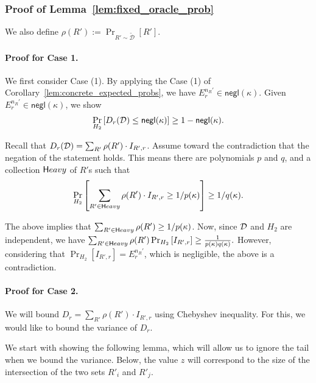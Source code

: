 \subsubsection{Proof of Lemma~\ref{lem:fixed_oracle_prob}}

We also define $\rho(R') := \Pr_{R' \sim \tilde{\mathcal{D}}}[R']$. 

\paragraph{Proof for Case 1.}
We first consider Case (1). By applying the Case (1) of 
Corollary~\ref{lem:concrete_expected_probs}, we have
$E^{n_R'}_{r} \in \mathsf{negl}(\kappa)$.  Given
$E^{n_R'}_{r} \in \mathsf{negl}(\kappa)$, we show 
\[
\Pr_{H_2}\left[ D_r(\DDD) \leq \mathsf{negl}(\kappa) \right] \ge 1 - \negl(\kappa).
\]

Recall that 
$D_r(\DDD) = \sum_{R'} \rho(R') \cdot I_{R',r}$.  Assume toward
the contradiction that the negation of the statement holds. This means
there are polynomials $p$ and $q$, and a collection $\sf Heavy$ of $R'$s
such that
%
\[ \Pr_{H_2}\left[
\sum_{R' \in {\sf Heavy}} \rho(R') \cdot I_{R', r} \ge 1/p(\kappa) \right] \ge 1/q(\kappa). 
\]

The above implies that $\sum_{R' \in {\sf Heavy}} \rho(R')  \ge 1/p(\kappa)$. 
Now, since $\DDD$ and $H_2$ are independent, we have
$
\sum_{R' \in {\sf Heavy}} \rho(R') \Pr_{H_2}\left[I_{R', r} \right] 
\ge \frac{1}{p(\kappa) q(\kappa)}.
$
However, considering that $\Pr_{H_2}\left[I_{R', r}\right] = E^{n_R'}_{r}$, which is negligible, the above is a contradiction.  


\paragraph{Proof for Case 2.}
We will bound $D_r = \sum_{R'} \rho(R') \cdot I_{R', r}$ using Chebyshev
inequality. For this, we would like to bound the variance of $D_r$.



We start with showing the following lemma, which will allow us to ignore
the tail when we bound the variance.  Below, the value $z$ will
correspond to the size of the intersection of the two sets $R'_i$ and
$R'_j$.

